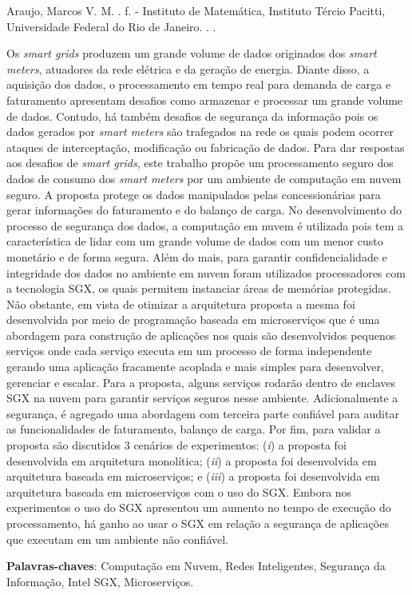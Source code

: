
\setlength{\absparsep}{18pt} %
\begin{resumo}

	Araujo, Marcos V. M. \textbf{\imprimirtitulo}. \pageref{LastPage} f. \imprimirtipotrabalho - Instituto de Matemática, Instituto Tércio Pacitti, Universidade Federal do Rio de Janeiro. \imprimirlocal. \imprimirdata. 
    
Os \textit{smart grids} produzem um grande volume de dados originados dos \textit{smart meters}, atuadores da rede elétrica e da geração de energia. Diante disso, a aquisição dos dados, o processamento em tempo real para demanda de carga e faturamento apresentam desafios como armazenar e processar um grande volume de dados. Contudo, há também desafios de segurança da informação pois os dados gerados por \textit{smart meters} são trafegados na rede os quais podem ocorrer ataques de interceptação, modificação ou fabricação de dados. Para dar respostas aos desafios de \textit{smart grids}, este trabalho propõe um processamento seguro dos dados de consumo dos \textit{smart meters} por um ambiente de computação em nuvem seguro. A proposta protege os dados manipulados pelas concessionárias para gerar informações do faturamento e do balanço de carga. No desenvolvimento do processo de segurança dos dados, a computação em nuvem é utilizada pois tem a característica de lidar com um grande volume de dados com um menor custo monetário e de forma segura. Além do mais, para garantir confidencialidade e integridade dos dados no ambiente em nuvem foram utilizados processadores com a tecnologia SGX, os quais permitem instanciar áreas de memórias protegidas. Não obstante, em vista de otimizar a arquitetura proposta a mesma foi desenvolvida por meio de programação baseada em microserviços que é uma abordagem para construção de aplicações nos quais são desenvolvidos pequenos serviços onde cada serviço executa em um processo de forma independente gerando uma aplicação fracamente acoplada e mais simples para desenvolver, gerenciar e escalar. Para a proposta, alguns serviços rodarão dentro de enclaves SGX na nuvem para garantir serviços seguros nesse ambiente. Adicionalmente a segurança, é agregado uma abordagem com terceira parte confiável para auditar as funcionalidades de faturamento, balanço de carga. Por fim, para validar a proposta são discutidos 3 cenários de experimentos: (\textit{i}) a proposta foi desenvolvida em arquitetura monolítica; (\textit{ii}) a proposta foi desenvolvida em arquitetura baseada em microserviços; e (\textit{iii}) a proposta foi desenvolvida em arquitetura baseada em microserviços com o uso do SGX. Embora nos experimentos o uso do SGX apresentou um aumento no tempo de execução do processamento, há ganho ao usar o SGX em relação a segurança de aplicações que executam em um ambiente não confiável.

 \textbf{Palavras-chaves}: Computação em Nuvem, Redes Inteligentes, Segurança da Informação, Intel SGX, Microserviços.
\end{resumo}

